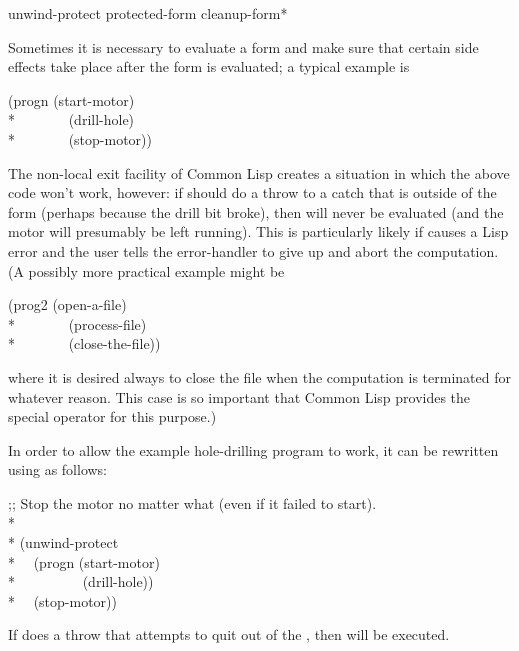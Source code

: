 \begin{defspec}
unwind-protect protected-form {cleanup-form}*

Sometimes it is necessary to evaluate a form and make sure that
certain side effects take place after the form is evaluated;
a typical example is
\begin{lisp}
(progn (start-motor) \\*
~~~~~~~(drill-hole) \\*
~~~~~~~(stop-motor))
\end{lisp}
The non-local exit facility of Common Lisp creates a situation in which
the above code won't work, however: if  should
do a throw to a catch that is outside of the 
form (perhaps because the drill bit broke),
then  will never be evaluated
(and the motor will presumably be left running).
This is particularly likely if  causes a Lisp error
and the user tells the error-handler to give up and abort
the computation.
(A possibly more practical example might be
\begin{lisp}
(prog2 (open-a-file) \\*
~~~~~~~(process-file) \\*
~~~~~~~(close-the-file))
\end{lisp}
where it is desired always to close the file when the computation
is terminated for whatever reason.  This case is so important
that Common Lisp provides the special operator  for
this purpose.)

In order to allow the example hole-drilling program to work, it can
be rewritten using  as follows:
\begin{lisp}
;; Stop the motor no matter what (even if it failed to start). \\*
\\*
(unwind-protect \\*
~~(progn (start-motor) \\*
~~~~~~~~~(drill-hole)) \\*
~~(stop-motor))
\end{lisp}
If  does a throw that attempts to quit out of the
, then  will be executed.


\end{defspec}

